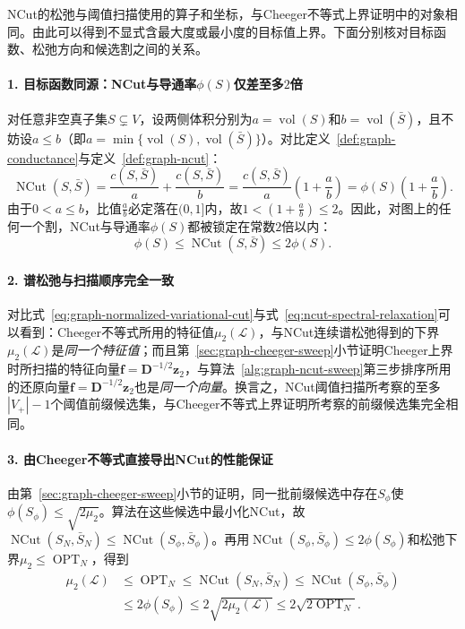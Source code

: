 NCut的松弛与阈值扫描使用的算子和坐标，与Cheeger不等式上界证明中的对象相同。由此可以得到不显式含最大度或最小度的目标值上界。下面分别核对目标函数、松弛方向和候选割之间的关系。

\paragraph{1. 目标函数同源：NCut与导通率$\phi(S)$仅差至多$2$倍}

对任意非空真子集$S\subsetneq V$，设两侧体积分别为$a=\operatorname{vol}(S)$和$b=\operatorname{vol}(\bar S)$，且不妨设$a\leq b$（即$a=\min\{\operatorname{vol}(S),\operatorname{vol}(\bar S)\}$）。对比定义~\ref{def:graph-conductance}与定义~\ref{def:graph-ncut}：
\[
\operatorname{NCut}(S,\bar S)
=\frac{c(S,\bar S)}{a}+\frac{c(S,\bar S)}{b}
=\frac{c(S,\bar S)}{a}\left(1+\frac{a}{b}\right)
=\phi(S)\left(1+\frac{a}{b}\right).
\]
由于$0<a\leq b$，比值$\frac{a}{b}$必定落在$(0,1]$内，故$1<\left(1+\frac{a}{b}\right)\leq 2$。因此，对图上的任何一个割，NCut与导通率$\phi(S)$都被锁定在常数$2$倍以内：
\begin{equation}
\label{eq:ncut-conductance-equivalence}
\phi(S)\leq\operatorname{NCut}(S,\bar S)\leq 2\phi(S).
\end{equation}

\paragraph{2. 谱松弛与扫描顺序完全一致}

对比式~\eqref{eq:graph-normalized-variational-cut}与式~\eqref{eq:ncut-spectral-relaxation}可以看到：Cheeger不等式所用的特征值$\mu_2(\mathcal L)$，与NCut连续谱松弛得到的下界$\mu_2(\mathcal L)$是\emph{同一个特征值}；而且第~\ref{sec:graph-cheeger-sweep}小节证明Cheeger上界时所扫描的特征向量$\bm f=\bm D^{-1/2}\bm z_2$，与算法~\ref{alg:graph-ncut-sweep}第三步排序所用的还原向量$\bm f=\bm D^{-1/2}\bm z_2$也是\emph{同一个向量}。换言之，NCut阈值扫描所考察的至多$|V_+|-1$个阈值前缀候选集，与Cheeger不等式上界证明所考察的前缀候选集完全相同。

\paragraph{3. 由Cheeger不等式直接导出NCut的性能保证}

由第~\ref{sec:graph-cheeger-sweep}小节的证明，同一批前缀候选中存在$S_\phi$使$\phi(S_\phi)\leq\sqrt{2\mu_2}$。算法在这些候选中最小化NCut，故$\operatorname{NCut}(S_N,\bar S_N)\leq\operatorname{NCut}(S_\phi,\bar S_\phi)$。再用$\operatorname{NCut}(S_\phi,\bar S_\phi)\leq2\phi(S_\phi)$和松弛下界$\mu_2\leq\operatorname{OPT}_N$，得到
\begin{equation}
\label{eq:graph-ncut-sweep-bound}
\begin{aligned}
\mu_2(\mathcal L)
&\leq \operatorname{OPT}_N
\leq \operatorname{NCut}(S_N,\bar S_N)
\leq \operatorname{NCut}(S_\phi,\bar S_\phi) \\
&\leq 2\phi(S_\phi)
\leq 2\sqrt{2\mu_2(\mathcal L)}
\leq 2\sqrt{2\operatorname{OPT}_N}.
\end{aligned}
\end{equation}

